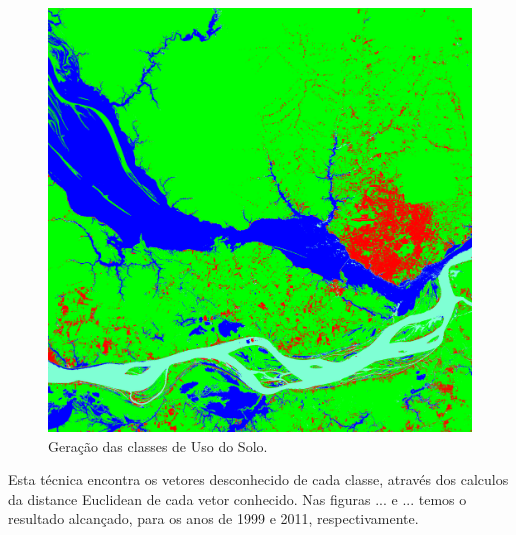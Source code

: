 \begin{itemize}
\begin{figure}[!htpb]
        \includegraphics[scale =0.1]{imagens/2011_banda1a7_Class_MinDist.png}
        \caption{Geração das classes de Uso do Solo.}
        \label{2011}
\end{figure}
\end{itemize}
\hspace{1.5cm}
Esta técnica encontra os vetores desconhecido de cada classe, através dos calculos da distance Euclidean de cada vetor conhecido. Nas figuras ... e ... temos o resultado alcançado, para os anos de 1999 e 2011, respectivamente.

